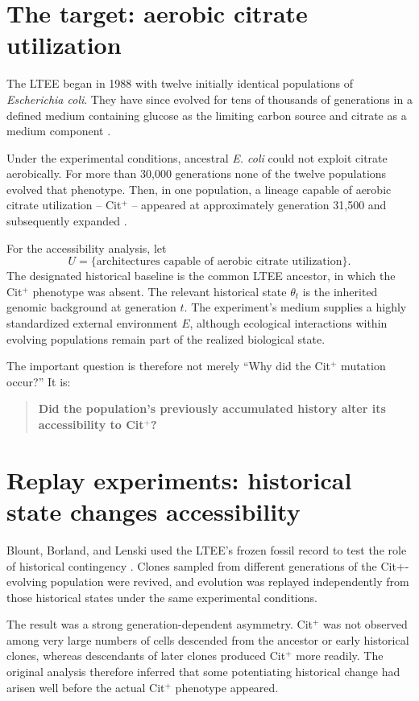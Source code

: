 \documentclass[11pt]{article}
\begin{document}
\section{The target: aerobic citrate utilization}

The LTEE began in 1988 with twelve initially identical populations of \emph{Escherichia coli}. They have since evolved for tens of thousands of generations in a defined medium containing glucose as the limiting carbon source and citrate as a medium component \cite{Blount2008}.

Under the experimental conditions, ancestral \emph{E. coli} could not exploit citrate aerobically. For more than 30,000 generations none of the twelve populations evolved that phenotype. Then, in one population, a lineage capable of aerobic citrate utilization -- Cit$^{+}$ -- appeared at approximately generation 31,500 and subsequently expanded \cite{Blount2008}.

For the accessibility analysis, let
\[
U=\{\text{architectures capable of aerobic citrate utilization}\}.
\]
The designated historical baseline is the common LTEE ancestor, in which the Cit$^{+}$ phenotype was absent. The relevant historical state $\theta_t$ is the inherited genomic background at generation $t$. The experiment's medium supplies a highly standardized external environment $E$, although ecological interactions within evolving populations remain part of the realized biological state.

The important question is therefore not merely ``Why did the Cit$^{+}$ mutation occur?'' It is:

\begin{quote}
\textbf{Did the population's previously accumulated history alter its accessibility to Cit$^{+}$?}
\end{quote}

\section{Replay experiments: historical state changes accessibility}

Blount, Borland, and Lenski used the LTEE's frozen fossil record to test the role of historical contingency \cite{Blount2008}. Clones sampled from different generations of the Cit+-evolving population were revived, and evolution was replayed independently from those historical states under the same experimental conditions.

The result was a strong generation-dependent asymmetry. Cit$^{+}$ was not observed among very large numbers of cells descended from the ancestor or early historical clones, whereas descendants of later clones produced Cit$^{+}$ more readily. The original analysis therefore inferred that some potentiating historical change had arisen well before the actual Cit$^{+}$ phenotype appeared.
\end{document}

